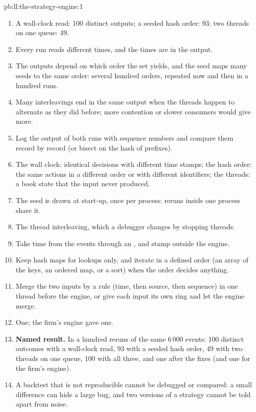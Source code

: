 \begin{solution}{pb:ll:the-strategy-engine:1}
\begin{enumerate}
\item A wall-clock read: 100 distinct outputs; a seeded hash order: 93; two threads on one queue: 49.
\item Every run reads different times, and the times are in the output.
\item The outputs depend on which order the set yields, and the seed maps many seeds to the same order: several hundred orders,
repeated now and then in a hundred runs.
\item Many interleavings end in the same output when the threads happen to alternate as they did before; more contention or
slower consumers would give more.
\item Log the output of both runs with sequence numbers and compare them record by record (or bisect on the hash of prefixes).
\item The wall clock: identical decisions with different time stamps; the hash order: the same actions in a different order or
with different identifiers; the threads: a book state that the input never produced.
\item The seed is drawn at start-up, once per process: reruns inside one process share it.
\item The thread interleaving, which a debugger changes by stopping threads.
\item Take time from the events through an , and stamp outside the engine.
\item Keep hash maps for lookups only, and iterate in a defined order (an array of the keys, an ordered map, or a sort) when the
order decides anything.
\item Merge the two inputs by a rule (time, then source, then sequence) in one thread before the engine, or give each input its
own ring and let the engine merge.
\item One; the firm's engine gave one.
\item \textbf{Named result.} In a hundred reruns of the same 6\,000 events: 100 distinct outcomes with a wall-clock read, 93 with
a seeded hash order, 49 with two threads on one queue, 100 with all three, and one after the fixes (and one for the firm's
engine).
\item A backtest that is not reproducible cannot be debugged or compared: a small difference can hide a large bug, and two
versions of a strategy cannot be told apart from noise.

\end{enumerate}
\end{solution}

